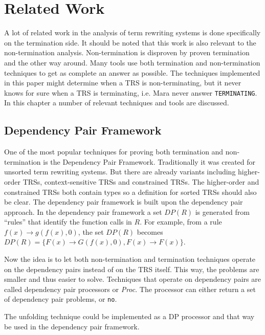 \newcommand\TTTT{%
 \textsf{T\kern-0.15em\raisebox{-0.55ex}T\kern-0.15emT\kern-0.15em\raisebox{-0.55ex}2\kern.15em}%
}
\newcommand\TTT{%
 \textsf{T\kern-0.15em\raisebox{-0.55ex}T\kern-0.15emT}%
}

\chapter{Related Work}\label{relatedwork}
A lot of related work in the analysis of term rewriting systems is done specifically on the termination side. It should be noted that this work is also relevant to the non-termination analysis. Non-termination is disproven by proven termination and the other way around. Many tools use both termination and non-termination techniques to get as complete an answer as possible. The techniques implemented in this paper might determine when a TRS is non-terminating, but it never knows for sure when a TRS is terminating, i.e. Mara never answer \texttt{TERMINATING}. In this chapter a number of relevant techniques and tools are discussed.

\section{Dependency Pair Framework}
One of the most popular techniques for proving both termination and non-termination is the Dependency Pair Framework\cite{thiemann2007dp}. Traditionally it was created for unsorted term rewriting systems. But there are already variants including higher-order TRSs, context-sensitive TRSs and constrained TRSs. The higher-order and constrained TRSs both contain types so a definition for sorted TRSs should also be clear. The dependency pair framework is built upon the dependency pair approach\cite{arts2000termination}. In the dependency pair framework a set $DP(R)$ is generated from ``rules'' that identify the function calls in $R$. For example, from a rule $f(x) \rightarrow g(f(x), 0)$, the set $DP(R)$ becomes $DP(R) = \{ F(x) \rightarrow G(f(x), 0), F(x) \rightarrow F(x) \}$.

Now the idea is to let both non-termination and termination techniques operate on the dependency pairs instead of on the TRS itself. This way, the problems are smaller and thus easier to solve. Techniques that operate on dependency pairs are called dependency pair processors or \textit{Proc}. The processor can either return a set of dependency pair problems, or \texttt{no}. 

The unfolding technique could be implemented as a DP processor and that way be used in the dependency pair framework. 
